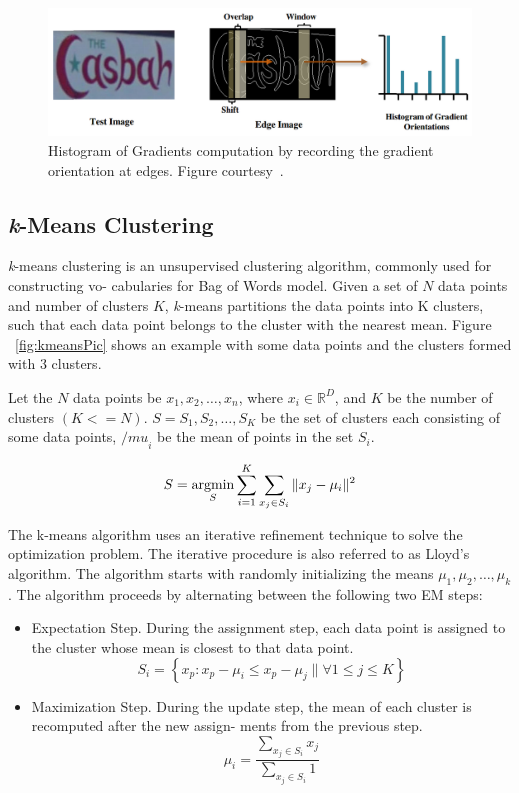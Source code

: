\begin{figure}
\centering
\includegraphics[scale=0.4]{figures/hogPic.png}
\caption{Histogram of Gradients computation by recording the gradient orientation at edges. Figure courtesy~\cite{Vibhor13}.}
\label{fig:hogPic}
\end{figure}

\subsection{\textit{k}-Means Clustering}
\textit{k}-means clustering is an unsupervised clustering algorithm, commonly used for constructing vo-
cabularies for Bag of Words model. Given a set of $N$ data points and number of clusters $K$, \textit{k}-means partitions the data points into K clusters, such that each data point belongs to the cluster with the nearest
mean. Figure ~\ref{fig:kmeansPic} shows an example with some data points and the clusters formed with 3 clusters.

Let the $N$ data points be $x_1, x_2, \ldots , x_n$, where $x_i \in \mathbb{R}^D$, and $K$ be the number of clusters $(K <= N)$. $S=S_1, S_2,\ldots ,S_K$ be the set of clusters each consisting of some data points, ${/mu}_i$ be the mean of points in the set $S_i$.

\begin{equation}
S = \operatornamewithlimits{argmin}_S \sum_{i=1}^{K} \sum_{x_j \in S_i} {\|{x_j - \mu_i}}\|^2
\end{equation}

The k-means algorithm uses an iterative refinement technique to solve the optimization problem.
The iterative procedure is also referred to as Lloyd’s algorithm. The algorithm starts with randomly initializing the means $\mu_1, \mu_2, \ldots, \mu_k$ . The algorithm proceeds by alternating between the following two EM steps:

\begin{itemize}
\item Expectation Step. During the assignment step, each data point is assigned to the cluster whose
mean is closest to that data point.
\begin{equation}
S_i = \left\lbrace x_p: x_p - \mu_i \leq x_p - \mu_j \| \forall 1 \leq j \leq K \right\rbrace
\end{equation}

\item Maximization Step. During the update step, the mean of each cluster is recomputed after the new assign-
ments from the previous step.
\begin{equation}
\mu_i = \frac{\sum_{x_j \in S_i} x_j}{\sum_{x_j \in S_i} 1}
\end{equation}
\end{itemize}

